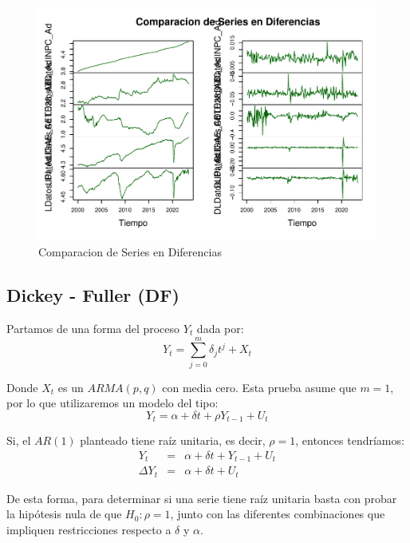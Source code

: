 \documentclass[
]{book}
\begin{document}
\begin{figure}

{\centering \includegraphics{Notas-Series-Tiempo_files/figure-latex/fig75-1} 

}

\caption{Comparacion de Series en Diferencias}\label{fig:fig75}
\end{figure}

\hypertarget{dickey---fuller-df}{%
\subsection{Dickey - Fuller (DF)}\label{dickey---fuller-df}}

Partamos de una forma del proceso \(Y_t\) dada por:
\begin{equation}
    Y_t = \sum_{j = 0}^m \delta_j t^j + X_t
    \label{eq:URDFG}
\end{equation}

Donde \(X_t\) es un \(ARMA(p, q)\) con media cero. Esta prueba asume que \(m = 1\), por lo que utilizaremos un modelo del tipo:
\begin{equation}
    Y_t = \alpha + \delta t + \rho Y_{t-1} + U_t
    \label{eq:URDF}
\end{equation}

Si, el \(AR(1)\) planteado tiene raíz unitaria, es decir, \(\rho = 1\), entonces tendríamos:
\begin{eqnarray*}
    Y_t & = & \alpha + \delta t + Y_{t-1} + U_t \\
    \Delta Y_t & = & \alpha + \delta t + U_t
\end{eqnarray*}

De esta forma, para determinar si una serie tiene raíz unitaria basta con probar la hipótesis nula de que \(H_0 : \rho = 1\), junto con las diferentes combinaciones que impliquen restricciones respecto a \(\delta\) y \(\alpha\).
\end{document}
